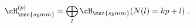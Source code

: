 \begin{equation}
 \cH_{\msc{symm}}^{(p)} = 
 \bigoplus_l  \cH_{\msc{symm}}(N(l)= kp+l) ~.
\label{hilbert symm}
\end{equation}

